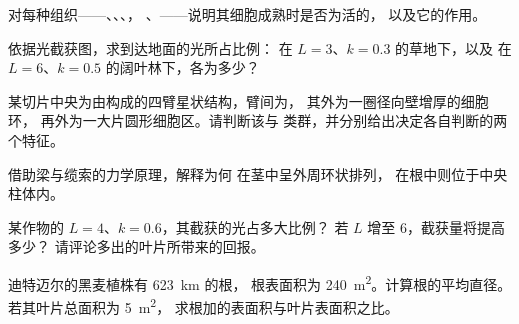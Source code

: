\begin{exercise}[$\star$]\label{exo:b1:flowering-plant-organization:3}
对每种组织——、、、，
、——说明其细胞成熟时是否为活的，
以及它的作用。
\end{exercise}

\begin{exercise}[$\star$]\label{exo:b1:flowering-plant-organization:4}
依据光截获图，求到达地面的光所占比例：
在 $L = 3$、$k = 0.3$ 的草地下，以及
在 $L = 6$、$k = 0.5$ 的阔叶林下，各为多少？
\end{exercise}

\begin{exercise}[$\star\star$]\label{exo:b1:flowering-plant-organization:5}
某切片中央为由构成的四臂星状结构，臂间为，
其外为一圈径向壁增厚的细胞环，
再外为一大片圆形细胞区。请判断该与
类群，并分别给出决定各自判断的两个特征。
\end{exercise}

\begin{exercise}[$\star\star$]\label{exo:b1:flowering-plant-organization:6}
借助梁与缆索的力学原理，解释为何
在茎中呈外周环状排列，
在根中则位于中央柱体内。
\end{exercise}

\begin{exercise}[$\star\star$]\label{exo:b1:flowering-plant-organization:7}
某作物的 $L = 4$、$k = 0.6$，其截获的光占多大比例？
若 $L$ 增至 6，截获量将提高多少？
请评论多出的叶片所带来的回报。
\end{exercise}

\begin{exercise}[$\star\star$]\label{exo:b1:flowering-plant-organization:8}
迪特迈尔的黑麦植株有 \qty{623}{km} 的根，
根表面积为 \qty{240}{m^2}。计算根的平均直径。
若其叶片总面积为 \qty{5}{m^2}，
求根加的表面积与叶片表面积之比。
\end{exercise}

